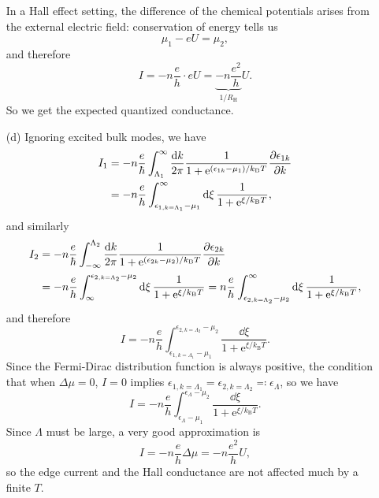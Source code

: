 \documentclass[hyperref, a4paper]{article}
\newcommand*{\ee}{\mathrm{e}}
\begin{document}
\begin{itemize}
In a Hall effect setting, the difference of the chemical potentials arises from the external electric field:
conservation of energy tells us 
\begin{equation}
    \mu_1 - e U = \mu_2,
\end{equation}
and therefore 
\begin{equation}
    I = - n \frac{e}{h} \cdot e U = \underbrace{ - n \frac{e^2}{h} }_{1 / R_{\text{H}}} U.
\end{equation}
So we get the expected quantized conductance.

\item[(d)] Ignoring excited bulk modes, we have 
\begin{equation}
    \begin{aligned}
        I_1 &= - n \frac{e}{\hbar} \int_{\Lambda_1}^{\infty} 
        \frac{\dd{k}}{2\pi} \frac{1}{1 + \ee^{(\epsilon_{1k} - \mu_1) / k_{\text{B}} T}} \pdv{\epsilon_{1k}}{k} \\
        &= - n \frac{e}{h} \int_{\epsilon_{1, k = \Lambda_1} - \mu_1}^{\infty} 
        \dd{\xi} \frac{1}{1 + \ee^{\xi / k_{\text{B}} T} }, 
    \end{aligned}
\end{equation}
and similarly 
\begin{equation}
    \begin{aligned}
        I_2 &= - n \frac{e}{\hbar} \int^{\Lambda_2}_{-\infty} 
        \frac{\dd{k}}{2\pi} \frac{1}{1 + \ee^{(\epsilon_{2k} - \mu_2) / k_{\text{B}} T}} \pdv{\epsilon_{2k}}{k} \\
        &= - n \frac{e}{h} \int^{\epsilon_{2, k = \Lambda_2} - \mu_2}_{\infty} 
        \dd{\xi} \frac{1}{1 + \ee^{\xi / k_{\text{B}} T} } 
        = n \frac{e}{h} \int_{\epsilon_{2, k = \Lambda_2} - \mu_2}^{\infty} 
        \dd{\xi} \frac{1}{1 + \ee^{\xi / k_{\text{B}} T} } , 
    \end{aligned}
    \label{eq:i-2-e}
\end{equation}
and therefore 
\begin{equation}
    I = - n \frac{e}{h} \int_{\epsilon_{1, k = \Lambda_1} - \mu_1}^{\epsilon_{2, k = \Lambda_2} - \mu_2}
    \frac{\dd{\xi}}{1 + \ee^{\xi / k_{\text{B}} T}}.
\end{equation}
Since the Fermi-Dirac distribution function is always positive,
the condition that when $\Delta \mu = 0$, $I = 0$
implies $\epsilon_{1, k=\Lambda_1} = \epsilon_{2, k=\Lambda_2} \eqqcolon \epsilon_\Lambda$, so we have 
\begin{equation}
    I = - n \frac{e}{h} \int_{\epsilon_{\Lambda} - \mu_1}^{\epsilon_{\Lambda} - \mu_2}
    \frac{\dd{\xi}}{1 + \ee^{\xi / k_{\text{B}} T}}.
\end{equation}
Since $\Lambda$ must be large, a very good approximation is 
\begin{equation}
    I = - n \frac{e}{h} \Delta \mu = - n \frac{e^2}{h} U,
\end{equation}
so the edge current and the Hall conductance are not affected much by a finite $T$.

\end{itemize}
\end{document}
